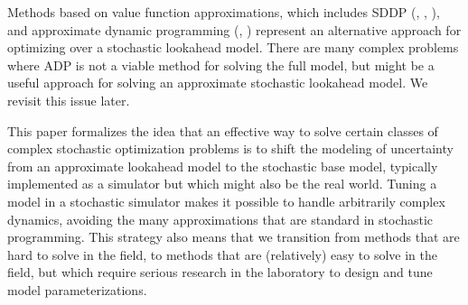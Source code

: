 \documentclass[11pt,oneside,fleqn,reqno,titlepage]{article}
\newcounter{example}
\begin{document}
Methods based on value function approximations, which includes SDDP (\cite{Pereira1991}, \cite{birge2011introduction}, \cite{Kall2009}), and approximate dynamic programming (\cite{PowellADP2011}, \cite{Bertsekas2017}) represent an alternative approach for optimizing over a stochastic lookahead model.  There are many complex problems where ADP is not a viable method for solving the full model, but might be a useful approach for solving an approximate stochastic lookahead model.  We revisit this issue later.


This paper formalizes the idea that an effective way to solve certain classes of complex stochastic optimization problems is to shift the modeling of uncertainty from an approximate lookahead model to the stochastic base model, typically implemented as a simulator but which might also be the real world. Tuning a model in a stochastic simulator makes it possible to handle arbitrarily complex dynamics, avoiding the many approximations that are standard in stochastic programming. This strategy also means that we transition from methods that are hard to solve in the field, to methods that are (relatively) easy to solve in the field, but which require serious research in the laboratory to design and tune model parameterizations.

\end{document}
